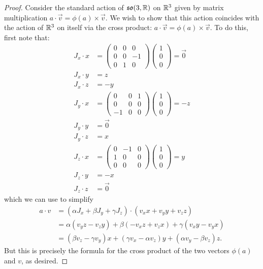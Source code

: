 \documentclass{../../mathnotes}
\begin{document}
\begin{proof}
    Consider the standard action of $\mathfrak{so}(3,\mathbb{R})$ on $\mathbb{R}^3$ given by matrix multiplication $a\cdot\vec v=\phi(a)\times\vec v$. We wish to show that
    this action coincides with the action of $\mathbb{R}^3$ on itself via the cross product: $a\cdot\vec v=\phi(a)\times \vec v$. To do this, first note that:
    \begin{align*}
        J_x\cdot x&=\begin{pmatrix}0&0&0\\0&0&-1\\0&1&0\end{pmatrix}
            \begin{pmatrix}
                1\\0\\0
            \end{pmatrix}
            =\vec 0\\
        J_x\cdot y&=z\\
        J_x\cdot z&=-y\\
        J_y\cdot x&=\begin{pmatrix}0&0&1\\0&0&0\\-1&0&0\end{pmatrix}
            \begin{pmatrix}
                1\\0\\0
            \end{pmatrix}
            =-z\\
        J_y\cdot y&=\vec 0\\
        J_y\cdot z&=x\\
        J_z\cdot x&=\begin{pmatrix}0&-1&0\\1&0&0\\0&0&0\end{pmatrix}
            \begin{pmatrix}
                1\\0\\0
            \end{pmatrix}
            =y\\
        J_z\cdot y&=-x\\
        J_z\cdot z&=\vec 0
    \end{align*}
    which we can use to simplify
    \begin{align*}
        a\cdot v&=\left( \alpha J_x+\beta J_y+\gamma J_z \right)\cdot (v_xx+v_yy+v_zz)\\
        &=\alpha\left( v_yz-v_zy \right)+\beta\left( -v_xz+v_zx \right)+\gamma\left( v_xy-v_yx \right)\\
        &=\left( \beta v_z-\gamma v_y \right)x+\left( \gamma v_x-\alpha v_z \right)y+\left( \alpha v_y-\beta v_z \right)z.
    \end{align*}
    But this is precisely the formula for the cross product of the two vectors $\phi(a)$ and $v$, as desired.
\end{proof}
\end{document}
